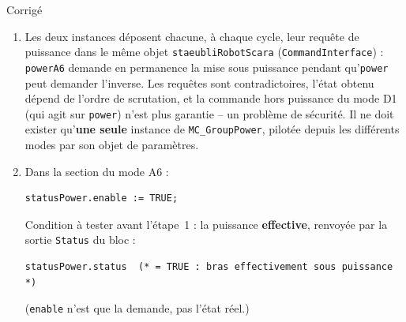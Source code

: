 \begin{UPSTIactivite}

\begin{UPSTIcorrectionP}{Corrigé}
\begin{enumerate}
    \item Les deux instances déposent chacune, à chaque cycle, leur requête
    de puissance dans le même objet \texttt{staeubliRobotScara}
    (\texttt{CommandInterface}) : \texttt{powerA6} demande en
    permanence la mise sous puissance pendant qu'\texttt{power}
    peut demander l'inverse. Les requêtes sont contradictoires, l'état
    obtenu dépend de l'ordre de scrutation, et la commande hors puissance
    du mode D1 (qui agit sur \texttt{power}) n'est plus garantie --
    un problème de sécurité. Il ne doit exister qu'\textbf{une seule}
    instance de \texttt{MC\_GroupPower}, pilotée depuis les différents modes
    par son objet de paramètres.
    \item Dans la section du mode A6 :
\begin{lstlisting}
statusPower.enable := TRUE;
\end{lstlisting}
    Condition à tester avant l'étape~1 : la puissance \textbf{effective},
    renvoyée par la sortie \texttt{Status} du bloc :
\begin{lstlisting}
statusPower.status  (* = TRUE : bras effectivement sous puissance *)
\end{lstlisting}
    (\texttt{enable} n'est que la demande, pas l'état réel.)
\end{enumerate}
\end{UPSTIcorrectionP}
\end{UPSTIactivite}

